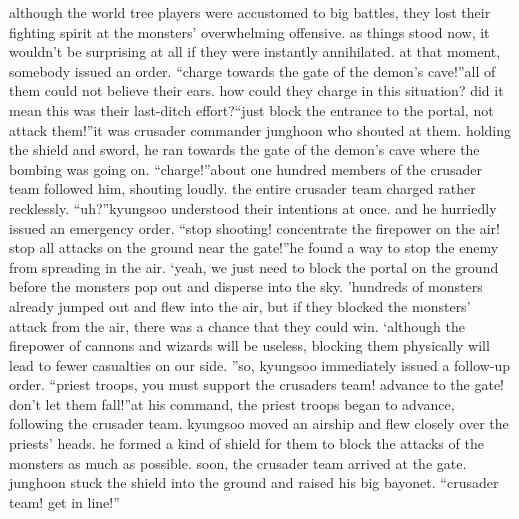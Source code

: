  although the world tree players were accustomed to big battles, they lost their fighting spirit at the monsters’ overwhelming offensive.
 as things stood now, it wouldn’t be surprising at all if they were instantly annihilated.
at that moment, somebody issued an order.
“charge towards the gate of the demon’s cave!”all of them could not believe their ears.
 how could they charge in this situation? did it mean this was their last-ditch effort?“just block the entrance to the portal, not attack them!”it was crusader commander junghoon who shouted at them.
holding the shield and sword, he ran towards the gate of the demon’s cave where the bombing was going on.
“charge!”about one hundred members of the crusader team followed him, shouting loudly.
the entire crusader team charged rather recklessly.
“uh?”kyungsoo understood their intentions at once.
 and he hurriedly issued an emergency order.
“stop shooting! concentrate the firepower on the air! stop all attacks on the ground near the gate!”he found a way to stop the enemy from spreading in the air.
‘yeah, we just need to block the portal on the ground before the monsters pop out and disperse into the sky.
’hundreds of monsters already jumped out and flew into the air, but if they blocked the monsters’ attack from the air, there was a chance that they could win.
‘although the firepower of cannons and wizards will be useless, blocking them physically will lead to fewer casualties on our side.
”so, kyungsoo immediately issued a follow-up order.
“priest troops, you must support the crusaders team! advance to the gate! don’t let them fall!”at his command, the priest troops began to advance, following the crusader team.
kyungsoo moved an airship and flew closely over the priests’ heads.
 he formed a kind of shield for them to block the attacks of the monsters as much as possible.
soon, the crusader team arrived at the gate.
 junghoon stuck the shield into the ground and raised his big bayonet.
“crusader team! get in line!”

